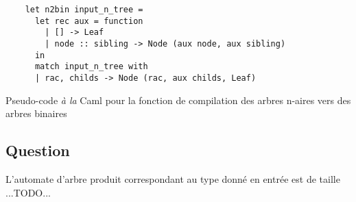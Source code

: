 \documentclass[twoside,12pt]{article}
\begin{document}
\begin{algorithm}
    \bigskip
\begin{verbatim}
    let n2bin input_n_tree =
      let rec aux = function
        | [] -> Leaf
        | node :: sibling -> Node (aux node, aux sibling)
      in
      match input_n_tree with
      | rac, childs -> Node (rac, aux childs, Leaf)
\end{verbatim}
   \caption{\small Pseudo-code \textit{à la} Caml pour la fonction de compilation des arbres
   n-aires vers des arbres binaires}
\end{algorithm}


\subsection{Question}
L'automate d'arbre produit correspondant au type donné en entrée est de taille ...TODO...

\end{document}
